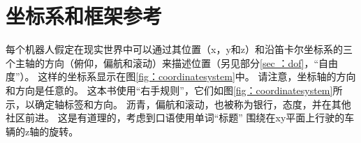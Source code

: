 \section{坐标系和框架参考}\label{sec:coordsystems}


每个机器人假定在现实世界中可以通过其位置（x，y和z）和沿笛卡尔坐标系的三个主轴的方向（俯仰，偏航和滚动）来描述位置（另见部分\ref {sec ：dof}，``自由度''）。 这样的坐标系显示在图\ref {fig：coordinatesystem}中。 请注意，坐标轴的方向和方向是任意的。 这本书使用“右手规则”，它们如图\ref {fig：coordinatesystem}所示，以确定轴标签和方向。 沥青，偏航和滚动，也被称为银行，态度，并在其他社区前进。      这是有道理的，考虑到口语使用单词“标题” 围绕在xy平面上行驶的车辆的z轴的旋转。

